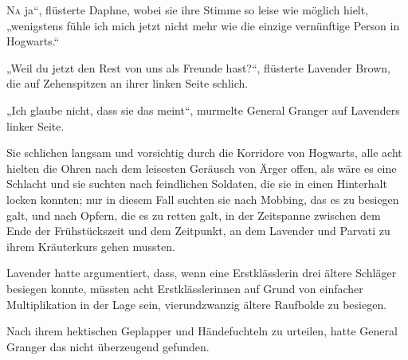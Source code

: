 
\lettrine[ante=„]{N}{a} ja“, flüsterte Daphne, wobei sie ihre Stimme so leise wie möglich hielt, „wenigstens fühle ich mich jetzt nicht mehr wie die einzige vernünftige Person in Hogwarts.“

„Weil du jetzt den Rest von uns als Freunde hast?“, flüsterte Lavender Brown, die auf Zehenspitzen an ihrer linken Seite schlich.

„Ich glaube nicht, dass sie das meint“, murmelte General Granger auf Lavenders linker Seite.

Sie schlichen langsam und vorsichtig durch die Korridore von Hogwarts, alle acht hielten die Ohren nach dem leisesten Geräusch von Ärger offen, als wäre es eine Schlacht und sie suchten nach feindlichen Soldaten, die sie in einen Hinterhalt locken konnten; nur in diesem Fall suchten sie nach Mobbing, das es zu besiegen galt, und nach Opfern, die es zu retten galt, in der Zeitspanne zwischen dem Ende der Frühstückszeit und dem Zeitpunkt, an dem Lavender und Parvati zu ihrem Kräuterkurs gehen mussten.

Lavender hatte argumentiert, dass, wenn eine Erstklässlerin drei ältere Schläger besiegen konnte, müssten acht Erstklässlerinnen auf Grund von einfacher Multiplikation in der Lage sein, vierundzwanzig ältere Raufbolde zu besiegen.

Nach ihrem hektischen Geplapper und Händefuchteln zu urteilen, hatte General Granger das nicht überzeugend gefunden.

